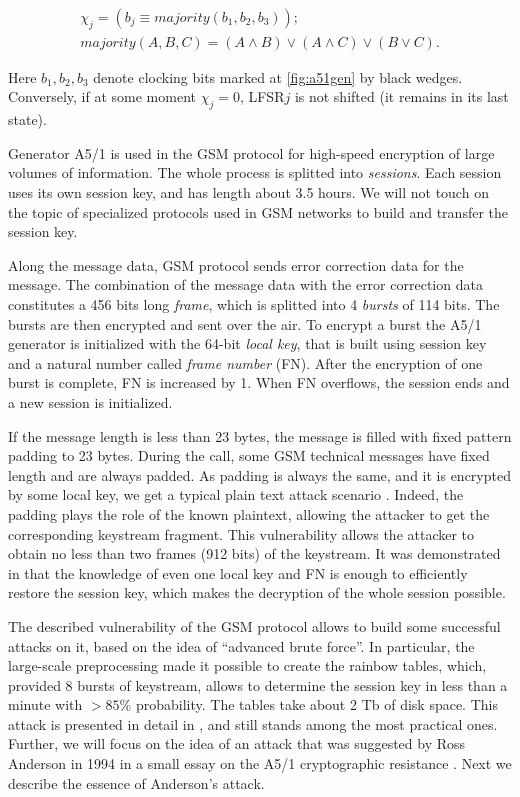 \documentclass[runningheads,a4paper]{llncs}[2015/06/24]
\begin{document}
\begin {gather*}
\chi_j = (b_j \equiv majority(b_1,b_2,b_3)); 
\\majority(A,B,C)=(A \wedge B) \vee (A \wedge C) \vee (B \vee C).
\end{gather*}

Here $b_1,b_2,b_3$ denote clocking bits marked at \cref{fig:a51gen} by black
wedges. Conversely, if at some moment $\chi_j=0$, LFSR$j$ is not shifted (it
remains in its last state).

Generator A5/1 is used in the GSM protocol for high-speed encryption of large
volumes of information. The whole process is splitted into \textit{sessions}. Each session uses its own session key, and has length about 3.5 hours. We will not touch on the topic of specialized protocols used in GSM networks to
build and transfer the session key.

Along the message data, GSM protocol sends error correction data for the
message. The combination of the message data with the error correction data constitutes a 456 bits
long \textit{frame}, which is splitted into 4 \textit{bursts} of 114 bits. The
bursts are then encrypted and sent over the air. To encrypt a burst the A5/1
generator is initialized with the 64-bit \textit{local key}, that is built using
session key and a natural number called \textit{frame number} (FN). After the
encryption of one burst is complete, FN is increased by 1. When
FN overflows, the session ends and a new session is initialized.

If the message length is less than 23 bytes, the message is filled with
fixed pattern padding to 23 bytes. During the call, some GSM technical messages have fixed length and are always padded. As padding is always the same, and it is encrypted by some local key, we get a typical plain text attack
scenario \cite{Menezes:1996:HAC:548089}. Indeed, the padding plays the role of the
known plaintext, allowing the attacker to get the corresponding keystream
fragment. This vulnerability allows the attacker to obtain no less than two frames
(912 bits) of the keystream. It was demonstrated in \cite{Nohl2010,GlendrangeHH2010} that the
knowledge of even one local key and FN is enough to efficiently restore the
session key, which makes the decryption of the whole session possible.

The described vulnerability of the GSM protocol allows to build some successful
attacks on it, based on the idea of ``advanced brute force''. In particular, the
large-scale preprocessing made it possible to create the rainbow tables,
which, provided 8 bursts of keystream, allows to determine the session key in less than a minute with $>85\%$ probability. The tables take about 2 Tb of disk space. This attack is presented in detail in \cite{Nohl2010},
and still stands among the most practical ones. Further, we will focus on the
idea of an attack that was suggested by Ross Anderson in 1994 in a small essay
on the A5/1 cryptographic resistance \cite{Anderson1994}. Next we describe the
essence of Anderson's attack.
\end{document}
